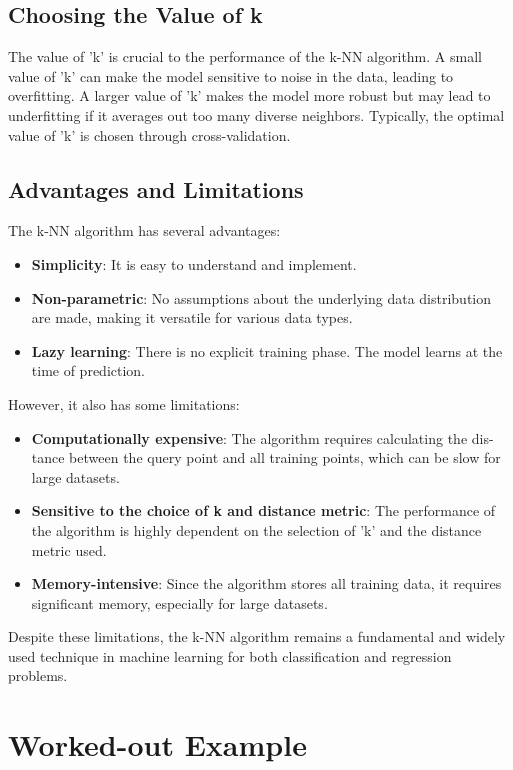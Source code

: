 \subsection{Choosing the Value of k}
\label{sec:ch3-choosing-k}

The value of 'k' is crucial to the performance of the k-NN algorithm. A small
value of 'k' can make the model sensitive to noise in the data, leading to
overfitting. A larger value of 'k' makes the model more robust but may lead
to underfitting if it averages out too many diverse neighbors. Typically, the
optimal value of 'k' is chosen through cross-validation.

\subsection{Advantages and Limitations}
\label{sec:ch3-advantages-limitations}

The k-NN algorithm has several advantages:
\begin{itemize}
  \item \textbf{Simplicity}: It is easy to understand and implement.
  \item \textbf{Non-parametric}: No assumptions about the underlying data distribution
    are made, making it versatile for various data types.
  \item \textbf{Lazy learning}: There is no explicit training phase. The model learns at
    the time of prediction.
\end{itemize}
However, it also has some limitations:
\begin{itemize}
  \item \textbf{Computationally expensive}: The algorithm requires calculating the dis-
    tance between the query point and all training points, which can be slow for
    large datasets.
  \item \textbf{Sensitive to the choice of k and distance metric}: The performance
    of the algorithm is highly dependent on the selection of 'k' and the distance
    metric used.
  \item \textbf{Memory-intensive}: Since the algorithm stores all training data, it requires
    significant memory, especially for large datasets.
\end{itemize}
Despite these limitations, the k-NN algorithm remains a fundamental and
widely used technique in machine learning for both classification and regression
problems.

\section{Worked-out Example}
\label{sec:ch3-worked-out}

